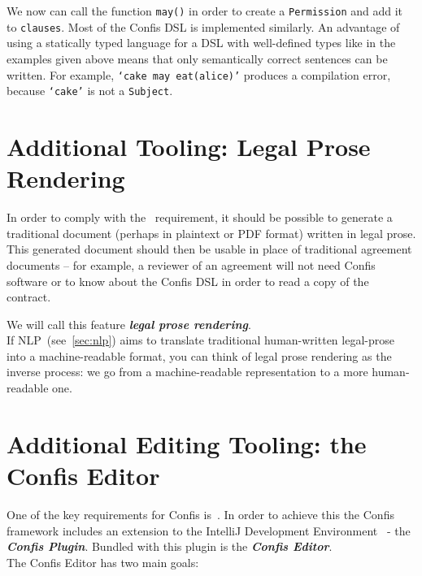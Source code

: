 We now can call the function \texttt{may()} in order to create a \texttt{Permission} and add it to \texttt{clauses}.
Most of the Confis DSL is implemented similarly.
An advantage of using a statically typed language for a DSL with well-defined types like in the examples given above means that only semantically correct sentences can be written.
For example, \texttt{`cake may eat(alice)'} produces a compilation error, because \texttt{`cake'} is not a \texttt{Subject}.\\




\section{Additional Tooling: Legal Prose Rendering}\label{sec:additional-tooling:doc-rendering}

In order to comply with the~ requirement, it should be possible to generate a traditional document (perhaps in plaintext or PDF format) written in legal prose.
This generated document should then be usable in place of traditional agreement documents -- for example, a reviewer of an agreement will not need Confis software or to know about the Confis DSL in order to read a copy of the contract.

We will call this feature \textbf{\emph{legal prose rendering}}.\\

If NLP~(see~\autoref{sec:nlp}) aims to translate traditional human-written legal-prose into a machine-readable format, you can think of legal prose rendering as the inverse process: we go from a machine-readable representation to a more human-readable one.


\section[The Confis Editor]{Additional Editing Tooling: the Confis Editor}\label{sec:confis-editor}

One of the key requirements for Confis is~.
In order to achieve this the Confis framework includes an extension to the IntelliJ Development Environment~\cite{intelliJRepo} - the \textbf{\emph{Confis Plugin}}.
Bundled with this plugin is the \textbf{\emph{Confis Editor}}.\\

The Confis Editor has two main goals:

